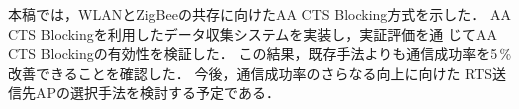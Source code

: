 \documentclass[technicalreport]{ieicej}
\begin{document}
本稿では，WLANとZigBeeの共存に向けたAA CTS Blocking方式を示した．
AA CTS Blockingを利用したデータ収集システムを実装し，実証評価を通
じてAA CTS Blockingの有効性を検証した．
この結果，既存手法よりも通信成功率を5\,\%改善できることを確認した．
今後，通信成功率のさらなる向上に向けた
RTS送信先APの選択手法を検討する予定である．


%
%
\end{document}

